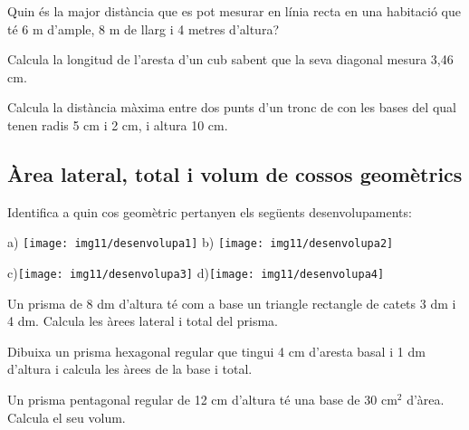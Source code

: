 \begin{activitats}
\begin{mylist}

\exer  Quin és la major distància que es pot mesurar en línia recta en una habitació que té 6 m d'ample, 8 m de llarg i 4 metres d'altura?


\exer  Calcula la longitud de l'aresta d'un cub sabent que la seva diagonal mesura 3,46 cm.


\exer  Calcula la distància màxima entre dos punts d'un tronc de con les bases del qual tenen radis 5 cm i 2 cm, i altura 10 cm.

 
 
\end{mylist}

\subsection{Àrea lateral, total i volum de cossos geomètrics}
 
\begin{mylist}
\exer Identifica a quin cos geomètric pertanyen els següents desenvolupaments:


a)  \texttt{[image: img11/desenvolupa1]}
b) \texttt{[image: img11/desenvolupa2]}

c)\texttt{[image: img11/desenvolupa3]}
d)\texttt{[image: img11/desenvolupa4]}
 

\exer  Un prisma de 8 dm d'altura té com a base un triangle rectangle de catets 3 dm i 4 dm. Calcula les àrees lateral i total del prisma.


\exer  Dibuixa un prisma hexagonal regular que tingui 4 cm d'aresta basal i 1 dm d'altura i calcula les àrees de la base i total.


\exer  Un prisma pentagonal regular de 12 cm d'altura té una base de 30 cm${}^{2}$ d'àrea. Calcula el seu volum.



\end{mylist}
\end{activitats}
